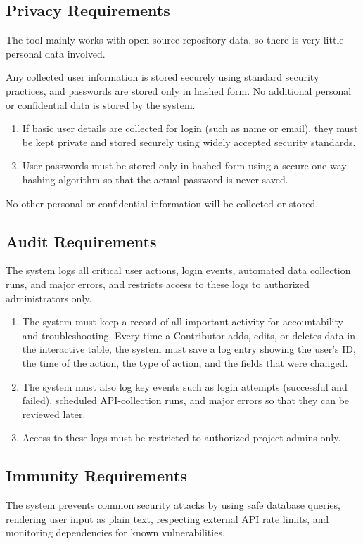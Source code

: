 \documentclass[12pt]{article}
\begin{document}
\subsection{Privacy Requirements}
The tool mainly works with open-source repository data, so there is very little personal data involved.

Any collected user information is stored securely using standard security practices, and passwords are stored only in hashed form. No additional personal or confidential data is stored by the system.
\begin{enumerate}[label=SR-P\arabic*]
\item If basic user details are collected for login (such as name or email), they must be kept private and stored securely using widely accepted security standards.
\item User passwords must be stored only in hashed form using a secure one-way hashing algorithm so that the actual password is never saved.
\end{enumerate}
No other personal or confidential information will be collected or stored.
\subsection{Audit Requirements}
The system logs all critical user actions, login events, automated data collection runs, and major errors, and restricts access to these logs to authorized administrators only.

\begin{enumerate}[label=SR-AU\arabic*]
\item The system must keep a record of all important activity for accountability and troubleshooting. Every time a Contributor adds, edits, or deletes data in the interactive table, the system must save a log entry showing the user’s ID, the time of the action, the type of action, and the fields that were changed.
\item The system must also log key events such as login attempts (successful and failed), scheduled API-collection runs, and major errors so that they can be reviewed later.
\item Access to these logs must be restricted to authorized project admins only.
\end{enumerate}
\subsection{Immunity Requirements}
The system prevents common security attacks by using safe database queries, rendering user input as plain text, respecting external API rate limits, and monitoring dependencies for known vulnerabilities.
\end{document}
